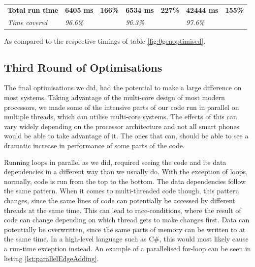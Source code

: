 \begin{table}[H]
\begin{tabular}{@{}lllllll@{}}
        \textbf{Total run time} & \textbf{6405 ms}                                                                          & \textbf{166\%}                                                                 & \textbf{6534 ms}                                                                           & \textbf{227\%}                                                                & \textbf{42444 ms}                                                                       & \textbf{155\%}                                                                \\
        \textit{Time covered}   & \textit{96.6\%}                                                                           & \textit{}                                                                      & \textit{96.3\%}                                                                            &                                                                               & \textit{97.6\%}                                                                         & \textit{}                                                                     \\ \bottomrule
    \end{tabular}
    \begin{tablenotes}
        \footnotesize{\item \textdagger As compared to the respective timings of table \ref{fig:0genoptimised}.}
    \end{tablenotes}
\end{table}

\subsection{Third Round of Optimisations}
The final optimisations we did, had the potential to make a large difference on most systems.
Taking advantage of the multi-core design of most modern processors, we made some of the intensive parts of our code run in parallel on multiple threads, which can utilise multi-core systems.
The effects of this can vary widely depending on the processor architecture and not all smart phones would be able to take advantage of it.
The ones that can, should be able to see a dramatic increase in performance of some parts of the code.

Running loops in parallel as we did, required seeing the code and its data dependencies in a different way than we usually do.
With the exception of loops, normally, code is run from the top to the bottom.
The data dependencies follow the same pattern.
When it comes to multi-threaded code though, this pattern changes, since the same lines of code can potentially be accessed by different threads at the same time.
This can lead to race-conditions, where the result of code can change depending on which thread gets to make changes first.
Data can potentially be overwritten, since the same parts of memory can be written to at the same time.
In a high-level language such as C\#, this would most likely cause a run-time exception instead.
An example of a parallelised for-loop can be seen in listing \ref{lst:parallelEdgeAdding}.

